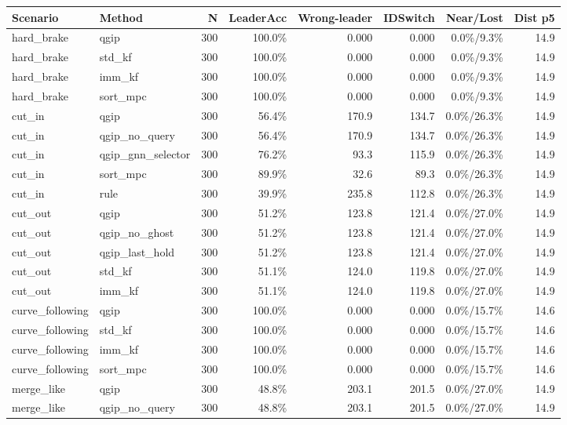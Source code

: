 \begin{tabular}{llrrrrrr}
\toprule
\textbf{Scenario} & \textbf{Method} & \textbf{N} & \textbf{LeaderAcc} & \textbf{Wrong-leader} & \textbf{IDSwitch} & \textbf{Near/Lost} & \textbf{Dist p5} \\
\midrule
hard\_brake & qgip & 300 & 100.0\% & 0.000 & 0.000 & 0.0\%/9.3\% & 14.9 \\
hard\_brake & std\_kf & 300 & 100.0\% & 0.000 & 0.000 & 0.0\%/9.3\% & 14.9 \\
hard\_brake & imm\_kf & 300 & 100.0\% & 0.000 & 0.000 & 0.0\%/9.3\% & 14.9 \\
hard\_brake & sort\_mpc & 300 & 100.0\% & 0.000 & 0.000 & 0.0\%/9.3\% & 14.9 \\
cut\_in & qgip & 300 & 56.4\% & 170.9 & 134.7 & 0.0\%/26.3\% & 14.9 \\
cut\_in & qgip\_no\_query & 300 & 56.4\% & 170.9 & 134.7 & 0.0\%/26.3\% & 14.9 \\
cut\_in & qgip\_gnn\_selector & 300 & 76.2\% & 93.3 & 115.9 & 0.0\%/26.3\% & 14.9 \\
cut\_in & sort\_mpc & 300 & 89.9\% & 32.6 & 89.3 & 0.0\%/26.3\% & 14.9 \\
cut\_in & rule & 300 & 39.9\% & 235.8 & 112.8 & 0.0\%/26.3\% & 14.9 \\
cut\_out & qgip & 300 & 51.2\% & 123.8 & 121.4 & 0.0\%/27.0\% & 14.9 \\
cut\_out & qgip\_no\_ghost & 300 & 51.2\% & 123.8 & 121.4 & 0.0\%/27.0\% & 14.9 \\
cut\_out & qgip\_last\_hold & 300 & 51.2\% & 123.8 & 121.4 & 0.0\%/27.0\% & 14.9 \\
cut\_out & std\_kf & 300 & 51.1\% & 124.0 & 119.8 & 0.0\%/27.0\% & 14.9 \\
cut\_out & imm\_kf & 300 & 51.1\% & 124.0 & 119.8 & 0.0\%/27.0\% & 14.9 \\
curve\_following & qgip & 300 & 100.0\% & 0.000 & 0.000 & 0.0\%/15.7\% & 14.6 \\
curve\_following & std\_kf & 300 & 100.0\% & 0.000 & 0.000 & 0.0\%/15.7\% & 14.6 \\
curve\_following & imm\_kf & 300 & 100.0\% & 0.000 & 0.000 & 0.0\%/15.7\% & 14.6 \\
curve\_following & sort\_mpc & 300 & 100.0\% & 0.000 & 0.000 & 0.0\%/15.7\% & 14.6 \\
merge\_like & qgip & 300 & 48.8\% & 203.1 & 201.5 & 0.0\%/27.0\% & 14.9 \\
merge\_like & qgip\_no\_query & 300 & 48.8\% & 203.1 & 201.5 & 0.0\%/27.0\% & 14.9 \\

\end{tabular}
